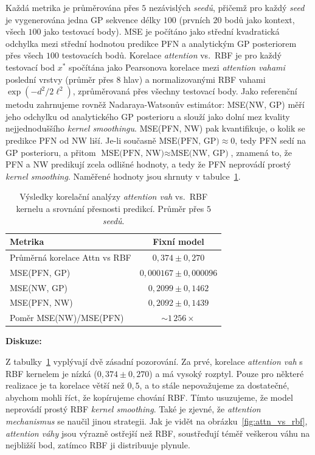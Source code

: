 Každá metrika je průměrována přes $5$ nezávislých \emph{seedů}, přičemž pro každý \emph{seed} je vygenerována jedna GP sekvence délky $100$ (prvních $20$ bodů jako kontext, všech $100$ jako testovací body).
MSE je počítáno jako střední kvadratická odchylka mezi střední hodnotou predikce PFN a analytickým GP posteriorem přes všech $100$ testovacích bodů.
Korelace \emph{attention} vs.\ RBF je pro každý testovací bod $x^*$ spočítána jako Pearsonova korelace mezi \emph{attention vahami} poslední vrstvy (průměr přes $8$ hlav) a normalizovanými RBF vahami $\exp(-d^2/2\ell^2)$, zprůměrovaná přes všechny testovací body.
Jako referenční metodu zahrnujeme rovněž Nadaraya-Watsonův estimátor: \textrm{MSE(NW, GP)} měří jeho odchylku od analytického GP posterioru a slouží jako dolní mez kvality nejjednoduššího \emph{kernel smoothingu}.
\textrm{MSE(PFN, NW)} pak kvantifikuje, o kolik se predikce PFN od NW liší.
Je-li současně $\textrm{MSE(PFN, GP)} \approx 0$, tedy PFN sedí na GP posterioru, a přitom $\textrm{MSE(PFN, NW)} \approx \textrm{MSE(NW, GP)}$, znamená to, že PFN a NW predikují zcela odlišné hodnoty, a tedy že PFN neprovádí prostý \emph{kernel smoothing}.
Naměřené hodnoty jsou shrnuty v tabulce~\ref{tab:exp3}.

\begin{table}[htbp]
\centering
\begin{tabular}{lc}
\hline
Metrika & Fixní model \\
\hline
Průměrná korelace Attn vs RBF & $0{,}374 \pm 0{,}270$ \\
MSE(PFN, GP)  & $0{,}000167 \pm 0{,}000096$ \\
MSE(NW, GP)   & $0{,}2099 \pm 0{,}1462$ \\
MSE(PFN, NW)  & $0{,}2092 \pm 0{,}1439$ \\
Poměr MSE(NW)/MSE(PFN) & ${\sim}1\,256\times$ \\
\hline
\end{tabular}
\caption{Výsledky korelační analýzy \emph{attention vah} vs.\ RBF kernelu a srovnání přesnosti predikcí. Průměr přes $5$ \emph{seedů}.}
\label{tab:exp3}
\end{table}

\textbf{Diskuze:}

Z tabulky~\ref{tab:exp3} vyplývají dvě zásadní pozorování.
Za prvé, korelace \emph{attention vah} s RBF kernelem je nízká ($0{,}374 \pm 0{,}270$) a má vysoký rozptyl.
Pouze pro některé realizace je ta korelace větší než $0{,}5$, a to stále nepovažujeme za dostatečné, abychom mohli říct, že kopírujeme chování RBF.
Tímto usuzujeme, že model neprovádí prostý RBF \emph{kernel smoothing}.
Také je zjevné, že \emph{attention mechanismus} se naučil jinou strategii.
Jak je vidět na obrázku~\ref{fig:attn_vs_rbf}, \emph{attention váhy} jsou výrazně ostřejší než RBF, soustřeďují téměř veškerou váhu na nejbližší bod, zatímco RBF ji distribuuje plynule.

